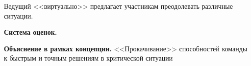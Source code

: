 
\par Ведущий <<виртуально>> предлагает участникам преодолевать различные ситуации.

\par \textbf{Система оценок.}

\par \textbf{Объяснение в рамках концепции.} <<Прокачивание>> способностей команды к быстрым и точным решениям в критической ситуации